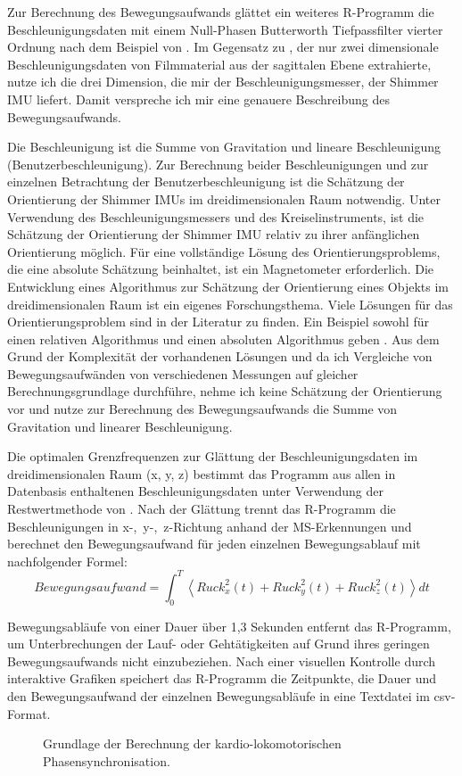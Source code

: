 Zur Berechnung des Bewegungsaufwands glättet ein weiteres R-Programm die Beschleunigungsdaten mit einem Null-Phasen Butterworth Tiefpassfilter vierter Ordnung nach dem Beispiel von \citet{Hreljac2000}. Im Gegensatz zu \citet{Hreljac2000}, der nur zwei dimensionale Beschleunigungsdaten von Filmmaterial aus der sagittalen Ebene extrahierte, nutze ich die drei Dimension, die mir der Beschleunigungsmesser, der Shimmer \ac{IMU} liefert. Damit verspreche ich mir eine genauere Beschreibung des Bewegungsaufwands.

Die Beschleunigung ist die Summe von Gravitation und lineare Beschleunigung (Benutzerbeschleunigung). Zur Berechnung beider Beschleunigungen und zur einzelnen Betrachtung der Benutzerbeschleunigung ist die Schätzung der Orientierung der Shimmer \acp{IMU} im dreidimensionalen Raum notwendig. Unter Verwendung des Beschleunigungsmessers und des Kreiselinstruments, ist die Schätzung der Orientierung der Shimmer \ac{IMU} relativ zu ihrer anfänglichen Orientierung möglich. Für eine vollständige Lösung des Orientierungsproblems, die eine absolute Schätzung beinhaltet, ist ein Magnetometer erforderlich. Die Entwicklung eines Algorithmus zur Schätzung der Orientierung eines Objekts im dreidimensionalen Raum ist ein eigenes Forschungsthema. Viele Lösungen für das Orientierungsproblem sind in der Literatur zu finden. Ein Beispiel sowohl für einen relativen Algorithmus und einen absoluten Algorithmus geben \citet{Madgwick2011}. Aus dem Grund der Komplexität der vorhandenen Lösungen und da ich Vergleiche von Bewegungsaufwänden von verschiedenen Messungen auf gleicher Berechnungsgrundlage durchführe, nehme ich keine Schätzung der Orientierung vor und nutze zur Berechnung des Bewegungsaufwands die Summe von Gravitation und linearer Beschleunigung.

Die optimalen Grenzfrequenzen zur Glättung der Beschleunigungsdaten im dreidimensionalen Raum (x, y, z) bestimmt das Programm aus allen in Datenbasis enthaltenen Beschleunigungsdaten unter Verwendung der Restwertmethode von \citet{Wells1980}. Nach der Glättung trennt das R-Programm die Beschleunigungen in \mbox{x-, y-, z-Richtung} anhand der \ac{MS}-Erkennungen und berechnet den Bewegungsaufwand für jeden einzelnen Bewegungsablauf mit nachfolgender Formel: 
\begin{equation}
	Bewegungsaufwand = \int^T_0 \left\langle {Ruck^2_{x}(t) + Ruck^2_{y}(t) + Ruck^2_{z}(t)}\right\rangle dt 
\end{equation}

Bewegungsabläufe von einer Dauer über 1,3 Sekunden entfernt das R-Programm, um Unterbrechungen der Lauf- oder Gehtätigkeiten auf Grund ihres geringen Bewegungsaufwands nicht einzubeziehen. Nach einer visuellen Kontrolle durch interaktive Grafiken speichert das R-Programm die Zeitpunkte, die Dauer und den Bewegungsaufwand der einzelnen Bewegungsabläufe in eine Textdatei im \acs{csv}-Format. 
\begin{figure}
	[!htb]  \caption[Grundlage der Berechnung der kardio-lokomotorischen Phasensynchronisation.]{Grundlage der Berechnung der kardio-lokomotorischen Phasensynchronisation.} \label{fig:grundlage_klps} 
\end{figure}


